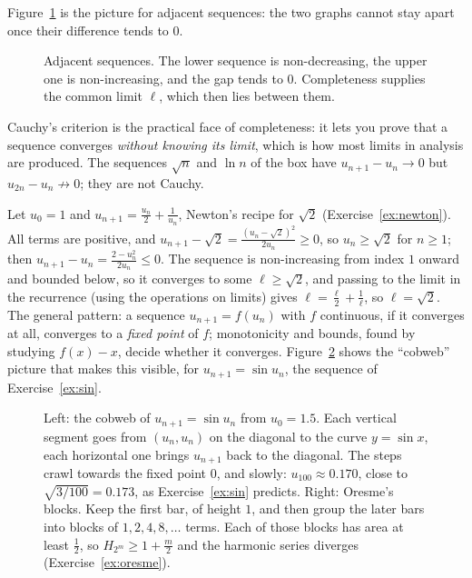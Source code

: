 Figure~\ref{fig:squeeze} is the picture for adjacent sequences: the two graphs cannot stay apart once their difference tends to $0$.

\begin{figure}[ht]
\centering
{}
\caption{Adjacent sequences. The lower sequence is non-decreasing, the upper one is non-increasing, and the gap tends to $0$. Completeness supplies the common limit $\ell$, which then lies between them.}
\label{fig:squeeze}
\end{figure}

Cauchy's criterion is the practical face of completeness: it lets you prove that a sequence converges \emph{without knowing its limit}, which is how
most limits in analysis are produced. The sequences $\sqrt n$ and $\ln n$ of the box have $u_{n+1}-u_n\to0$ but $u_{2n}-u_n\not\to0$; they are not Cauchy.

\begin{examplex}
Let $u_0=1$ and $u_{n+1}=\frac{u_n}2+\frac1{u_n}$, Newton's recipe for $\sqrt2$ (Exercise~\ref{ex:newton}). All terms are positive, and
$u_{n+1}-\sqrt2=\frac{(u_n-\sqrt2)^2}{2u_n}\ge0$, so $u_n\ge\sqrt2$ for $n\ge1$; then $u_{n+1}-u_n=\frac{2-u_n^2}{2u_n}\le0$. The sequence is
non-increasing from index $1$ onward and bounded below, so it converges to some $\ell\ge\sqrt2$, and passing to the limit in the recurrence (using the operations on limits)
gives $\ell=\frac\ell2+\frac1\ell$, so $\ell=\sqrt2$. The general pattern: a sequence $u_{n+1}=f(u_n)$ with $f$ continuous, if it converges at all,
converges to a \emph{fixed point} of $f$; monotonicity and bounds, found by studying $f(x)-x$, decide whether it converges. Figure~\ref{fig:cobweb}
shows the ``cobweb'' picture that makes this visible, for $u_{n+1}=\sin u_n$, the sequence of Exercise~\ref{ex:sin}.
\end{examplex}

\begin{figure}[ht]
\centering
{}
\caption{Left: the cobweb of $u_{n+1}=\sin u_n$ from $u_0=1.5$. Each vertical segment goes from $(u_n,u_n)$ on the diagonal to the curve $y=\sin x$, each horizontal one brings $u_{n+1}$ back to the diagonal. The steps crawl towards the fixed point $0$, and slowly: $u_{100}\approx0.170$, close to $\sqrt{3/100}=0.173$, as Exercise~\ref{ex:sin} predicts. Right: Oresme's blocks. Keep the first bar, of height $1$, and then group the later bars into blocks of $1,2,4,8,\dots$ terms. Each of those blocks has area at least $\frac12$, so $H_{2^m}\ge1+\frac m2$ and the harmonic series diverges (Exercise~\ref{ex:oresme}).}
\label{fig:cobweb}
\end{figure}

